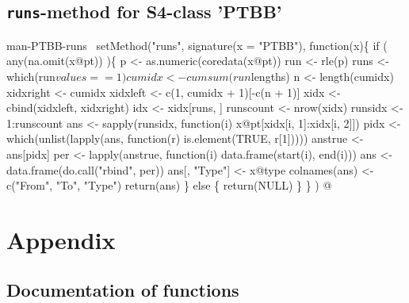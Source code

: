 \documentclass[a4paper]{article}
\begin{document}
\subsection{\texttt{runs}-method for S4-class 'PTBB'}

\nwenddocs{}\endmoddef\let\nwnotused=\nwoutput{}
\LA{}man-PTBB-runs~{\nwtagstyle{}}\RA{}
setMethod("runs",
          signature(x = "PTBB"), function(x)\{
              if ( any(na.omit(x@pt)) )\{
                  p <- as.numeric(coredata(x@pt))
                  run <- rle(p)
                  runs <- which(run$values == 1)
                  cumidx <- cumsum(run$lengths)
                  n <- length(cumidx)
                  xidxright <- cumidx
                  xidxleft <- c(1, cumidx + 1)[-c(n + 1)]
                  xidx <- cbind(xidxleft, xidxright)
                  idx <- xidx[runs, ]
                  runscount <- nrow(xidx)
                  runsidx <- 1:runscount
                  ans <- sapply(runsidx, function(i)
                      x@pt[xidx[i, 1]:xidx[i, 2]])
                  pidx <- which(unlist(lapply(ans, function(r)
                      is.element(TRUE, r[1]))))
                  anstrue <- ans[pidx]
                  per <- lapply(anstrue, function(i)
                      data.frame(start(i), end(i)))
                  ans <- data.frame(do.call("rbind", per))
                  ans[, "Type"] <- x@type
                  colnames(ans) <- c("From", "To", "Type")
                  return(ans)
              \} else \{
                  return(NULL)
              \}
          \}
)
\nwnotused{PtbbMethods.R}\nwendcode{}@


\section{Appendix}
\label{S4}

\subsection{Documentation of functions}
\label{S4SS1}
\end{document}
